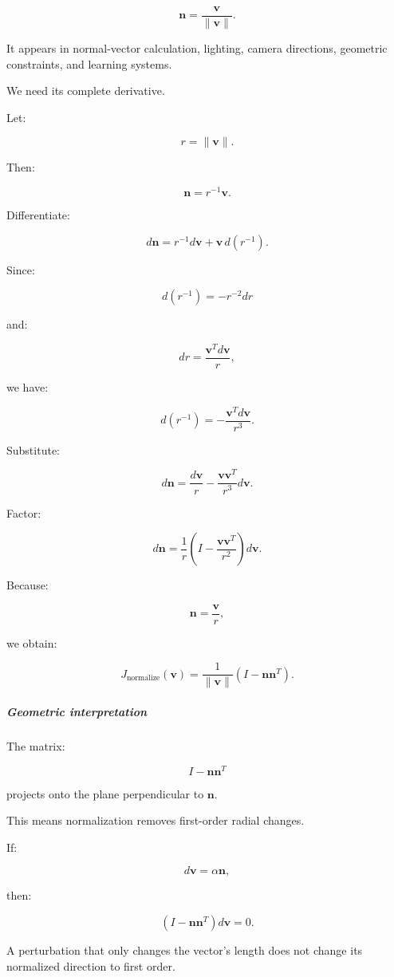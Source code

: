 \[
\mathbf n= \frac{\mathbf v}{\|\mathbf v\|}.
\]

It appears in normal-vector calculation, lighting, camera directions, geometric constraints, and learning systems.

We need its complete derivative.

Let:

\[
r=\|\mathbf v\|.
\]

Then:

\[
\mathbf n=r^{-1}\mathbf v.
\]

Differentiate:

\[
d\mathbf n = r^{-1}d\mathbf v+ \mathbf v\,d(r^{-1}).
\]

Since:

\[
d(r^{-1})=-r^{-2}dr
\]

and:

\[
dr=\frac{\mathbf v^Td\mathbf v}{r},
\]

we have:

\[
d(r^{-1}) = -\frac{\mathbf v^Td\mathbf v}{r^3}.
\]

Substitute:

\[
d\mathbf n= \frac{d\mathbf v}{r} - \frac{\mathbf v\mathbf v^T}{r^3}d\mathbf v.
\]

Factor:

\[
d\mathbf n= \frac1r \left( I-\frac{\mathbf v\mathbf v^T}{r^2} \right)d\mathbf v.
\]

Because:

\[
\mathbf n=\frac{\mathbf v}{r},
\]

we obtain:

\[
\boxed{ J_{\mathrm{normalize}}(\mathbf v) = \frac1{\|\mathbf v\|} (I-\mathbf n\mathbf n^T) }.
\]

\subparagraph{Geometric interpretation}\label{geometric-interpretation}

The matrix:

\[
I-\mathbf n\mathbf n^T
\]

projects onto the plane perpendicular to \(\mathbf n\).

This means normalization removes first-order radial changes.

If:

\[
d\mathbf v=\alpha\mathbf n,
\]

then:

\[
(I-\mathbf n\mathbf n^T)d\mathbf v=0.
\]

A perturbation that only changes the vector's length does not change its normalized direction to first order.

